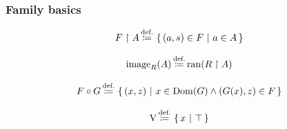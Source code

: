 \subsubsection{Family basics}
%
%
%

\begin{definition}[restriction]%
\[
F\restriction A\,{\stackrel{{\textrm{def.}}}{\coloneqq}}\,\left\{\,(a,s)\in F\ \middle|\ a\in A\,\right\}
\]
\end{definition}
\begin{definition}[image]%
\[
\mathrm{image}_R(A)\,{\stackrel{{\textrm{def.}}}{\coloneqq}}\,\mathrm{ran}(R\restriction A)
\]
\end{definition}

 %
\begin{definition}[composition]%
\[
F \circ G \,{\stackrel{{\textrm{def.}}}{\coloneqq}}\, \left\{\,(x,z)\ \middle|\ x \in \mathrm{Dom}(G) \land (G(x),z)\in F\,\right\}
\]%
\end{definition}
\iffalse %
\begin{definition}
\[
\V\eqdef\cc{x}{\top}%
\]
\end{definition}
